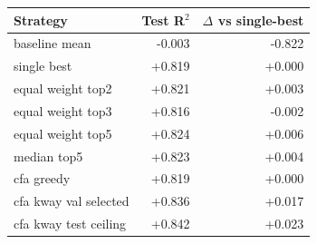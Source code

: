 \begin{tabular}{lrr}
\toprule
Strategy & Test R$^2$ & $\Delta$ vs single-best \\
\midrule
baseline mean & -0.003 & -0.822 \\
single best & +0.819 & +0.000 \\
equal weight top2 & +0.821 & +0.003 \\
equal weight top3 & +0.816 & -0.002 \\
equal weight top5 & +0.824 & +0.006 \\
median top5 & +0.823 & +0.004 \\
cfa greedy & +0.819 & +0.000 \\
cfa kway val selected & +0.836 & +0.017 \\
cfa kway test ceiling & +0.842 & +0.023 \\
\bottomrule
\end{tabular}